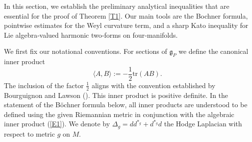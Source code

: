 \documentclass[12pt, twoside]{article}
\theoremstyle{definition}
\numberwithin{equation}{section}
\def \De {\Delta}
\begin{document}
In this section, we establish the preliminary analytical inequalities that are essential for the proof of Theorem \ref{T1}. Our main tools are the Bochner formula, pointwise estimates for the Weyl curvature term, and a sharp Kato inequality for Lie algebra‑valued harmonic two‑forms on four‑manifolds.

We first fix our notational conventions. For sections of $\mathfrak{g}_{P}$ we define the canonical inner product
\begin{equation}\label{E1}
\langle A,B\rangle:=-\frac{1}{2}\mathrm{tr}(AB).
\end{equation}
The inclusion of the factor $\frac{1}{2}$ aligns with the convention established by Bourguignon and Lawson (\cite[(2.14)]{BL81}). This inner product is positive definite. In the statement of the Böchner formula below, all inner products are understood to be defined using the given Riemannian metric in conjunction with the algebraic inner product (\ref{E1}).  We denote by $\De_{g}=dd^{\ast_{g}}+d^{\ast_{g}}d$ the Hodge Laplacian with respect to metric $g$ on $M$.
\end{document}
